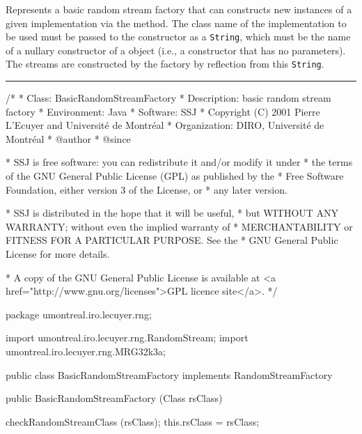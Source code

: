 
Represents a basic random stream factory that can constructs new
instances of a given  implementation via the
 method.
The class name of the implementation to be used must be passed to
the constructor as a \texttt{String}, which must be the name of
a nullary constructor of a  object
(i.e., a constructor that has no parameters).
The streams are constructed by the factory by reflection from this
\texttt{String}. 


\bigskip\hrule

\begin{code}
\begin{hide}
/*
 * Class:        BasicRandomStreamFactory
 * Description:  basic random stream factory
 * Environment:  Java
 * Software:     SSJ 
 * Copyright (C) 2001  Pierre L'Ecuyer and Université de Montréal
 * Organization: DIRO, Université de Montréal
 * @author       
 * @since

 * SSJ is free software: you can redistribute it and/or modify it under
 * the terms of the GNU General Public License (GPL) as published by the
 * Free Software Foundation, either version 3 of the License, or
 * any later version.

 * SSJ is distributed in the hope that it will be useful,
 * but WITHOUT ANY WARRANTY; without even the implied warranty of
 * MERCHANTABILITY or FITNESS FOR A PARTICULAR PURPOSE.  See the
 * GNU General Public License for more details.

 * A copy of the GNU General Public License is available at
   <a href="http://www.gnu.org/licenses">GPL licence site</a>.
 */
\end{hide}
package umontreal.iro.lecuyer.rng;\begin{hide}

import umontreal.iro.lecuyer.rng.RandomStream;
import umontreal.iro.lecuyer.rng.MRG32k3a;
\end{hide}

public class BasicRandomStreamFactory implements RandomStreamFactory\begin{hide} {
   private Class rsClass;
\end{hide}

   public BasicRandomStreamFactory (Class rsClass)\begin{hide} {
      checkRandomStreamClass (rsClass);
      this.rsClass = rsClass;
   }\end{hide}
\end{code}

